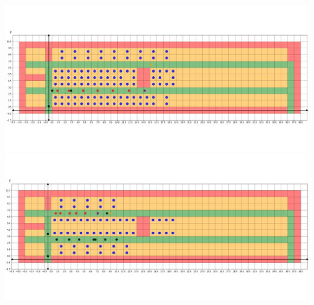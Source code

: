 \documentclass{article}
\theoremstyle{definition}
\theoremstyle{remark}
\numberwithin{equation}{section}
\begin{document}
\begin{center}
		\clearpage
		\thispagestyle{empty}
		\includegraphics[width=14cm]{twobtf2.jpg}\\
		\includegraphics[width=14cm]{twobtf3.jpg}\\
	\end{center}
\end{document}
